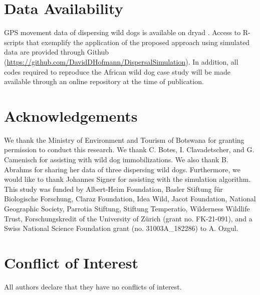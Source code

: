 \documentclass[abstract=on,10pt,a4paper,bibliography=totocnumbered]{article}
\begin{document}
\section{Data Availability}
GPS movement data of dispersing wild dogs is available on dryad
\citep{Hofmann.2021b}. Access to R-scripts that exemplify the application of the
proposed approach using simulated data are provided through Github
(\url{https://github.com/DavidDHofmann/DispersalSimulation}). In addition, all
codes required to reproduce the African wild dog case study will be made
available through an online repository at the time of publication.

\section{Acknowledgements}
We thank the Ministry of Environment and Tourism of Botswana for granting
permission to conduct this research. We thank C. Botes, I. Clavadetscher, and G.
Camenisch for assisting with wild dog immobilizations. We also thank B. Abrahms
for sharing her data of three dispersing wild dogs. Furthermore, we would like
to thank Johannes Signer for assisting with the simulation algorithm. This study
was funded by Albert-Heim Foundation, Basler Stiftung für Biologische Forschung,
Claraz Foundation, Idea Wild, Jacot Foundation, National Geographic Society,
Parrotia Stiftung, Stiftung Temperatio, Wilderness Wildlife Trust,
Forschungskredit of the University of Zürich (grant no. FK-21-091), and a Swiss
National Science Foundation grant (no. 31003A\_182286) to A. Ozgul.

\section{Conflict of Interest}
All authors declare that they have no conflicts of interest.

\newpage
\begingroup
\singlespacing

\endgroup
\end{document}
